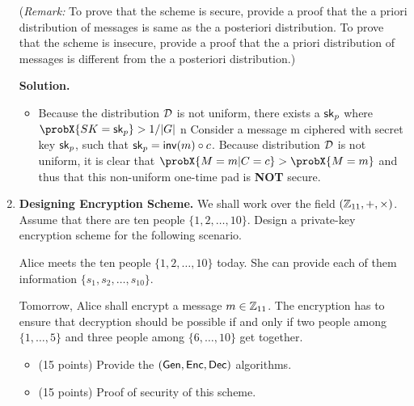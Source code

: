 \documentclass[11pt]{article}
\newcommand{\nextoddpage}{\checkoddpage\ifoddpage{\ \newpage\ \newpage}\else{\ \newpage}\fi}
\begin{document}
\begin{enumerate}
  (\footnotesize{\em Remark:} 
    To prove that the scheme is secure, provide a proof that the a priori distribution of messages is same as the a posteriori distribution. 
    To prove that the scheme is insecure, provide a proof that the a priori distribution of messages is different from the a posteriori distribution.)
  
  {\bfseries Solution.} 
  \begin{itemize} 
  \item Because the distribution ${\mathcal D}$ is not uniform, there exists a $\mathsf{sk}_p$ where $\probX{SK = \sk_p} > 1/\abs G$ n
 	Consider a message m ciphered with secret key $\mathsf{sk}_p$, such that $\mathsf{sk}_p = \mathsf{inv}(m) \circ c$. Because distribution ${\mathcal D}$ is not uniform, it is clear that $\probX{M = m | C = c} > \probX{M = m}$ and thus that this non-uniform one-time pad is {\bfseries NOT} secure.
  \end{itemize}
    
    
    
\nextoddpage 
\item {\bfseries Designing Encryption Scheme.} 
  We shall work over the field $({\mathbb Z}_{11},+,\times)$. 
  Assume that there are ten people $\{1,2,\dotsc,10\}$. 
  Design a private-key encryption scheme for the following scenario. 
  
  Alice meets the ten people $\{1,2,\dotsc,10\}$ today. 
  She can provide each of them information $\{s_1,s_2,\dotsc,s_{10}\}$. 
  
  Tomorrow, Alice shall encrypt a message $m\in{\mathbb Z}_{11}$. 
  The encryption has to ensure that decryption should be possible if and only if two people among $\{1,\dotsc,5\}$ and three people among $\{6,\dotsc,10\}$ get together.
  
  
  \begin{itemize}
  \item (15 points) Provide the $(\mathsf{Gen},\mathsf{Enc},\mathsf{Dec})$ algorithms. 
  \item (15 points) Proof of security of this scheme. 
  \end{itemize}
  

\end{enumerate}
\end{document}
